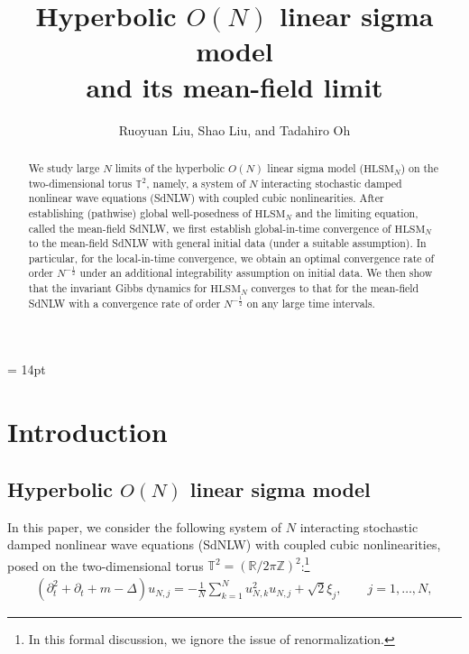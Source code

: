 \documentclass[letterpaper, 11pt,  reqno]{amsart}
\title[Hyperbolic $O (N)$ linear sigma model]{Hyperbolic $O (N)$ linear sigma model\\
and its mean-field limit}
\author[R.~Liu, S.~Liu, and T.~Oh]{Ruoyuan Liu, Shao Liu, and Tadahiro Oh}
\newcommand{\1}{\hspace{0.5mm}\text{I}\hspace{0.2mm}}
\newcommand{\R}{\mathbb{R}}
\newcommand{\T}{\mathbb{T}}
\newcommand{\Z}{\mathbb{Z}}
\newcommand{\Dl}{\Delta}
\newcommand{\dt}{\partial_t}
\newcommand{\HLS}{$\text{HLSM}_N$ }
\newcommand{\HLSS}{$\text{HLSM}_N$}
\numberwithin{equation}{section}
\numberwithin{theorem}{section}
\begin{document}
\baselineskip = 14pt



\begin{abstract} 

We study large $N$ limits of 
the hyperbolic $O(N)$ linear sigma model
(\HLSS) on the two-dimensional torus $\T^2$, 
namely, 
a  system of
$N$ interacting 
stochastic damped nonlinear wave equations (SdNLW) with 
coupled cubic nonlinearities.
After establishing (pathwise) global well-posedness
of \HLS and the limiting equation, called the mean-field SdNLW, 
we first establish global-in-time convergence of 
\HLS  to 
the mean-field SdNLW 
with general initial data
(under a suitable assumption).
In particular, for the local-in-time convergence, 
we obtain 
an optimal  convergence rate of order $N^{- \frac 12}$
under an additional integrability assumption on initial data.
We then show that
 the invariant Gibbs dynamics for \HLS  converges to 
 that for the mean-field SdNLW
 with 
a convergence rate of order $N^{- \frac 12}$ 
on any large time intervals. 
 
 





\end{abstract}





\maketitle


\tableofcontents




\section{Introduction}
\label{SEC:1}


\subsection{Hyperbolic $O (N)$ linear sigma model} 
\label{SUBSEC:1.1}
In this paper, we consider the following system of 
$N$ interacting 
stochastic damped nonlinear wave equations (SdNLW)
with coupled cubic nonlinearities, posed on the two-dimensional torus $\T^2 = (\R / 2 \pi \Z)^2$:\footnote{In this  formal discussion, we ignore the issue of renormalization.}
\begin{align}
    (\dt^2 + \dt + m - \Dl) u_{N, j} = - \frac 1N \sum_{k = 1}^N u_{N, k}^2 u_{N, j} + \sqrt{2} \xi_j,
\qquad j = 1, \dots, N, 
\label{NLW1}
\end{align}
\end{document}
